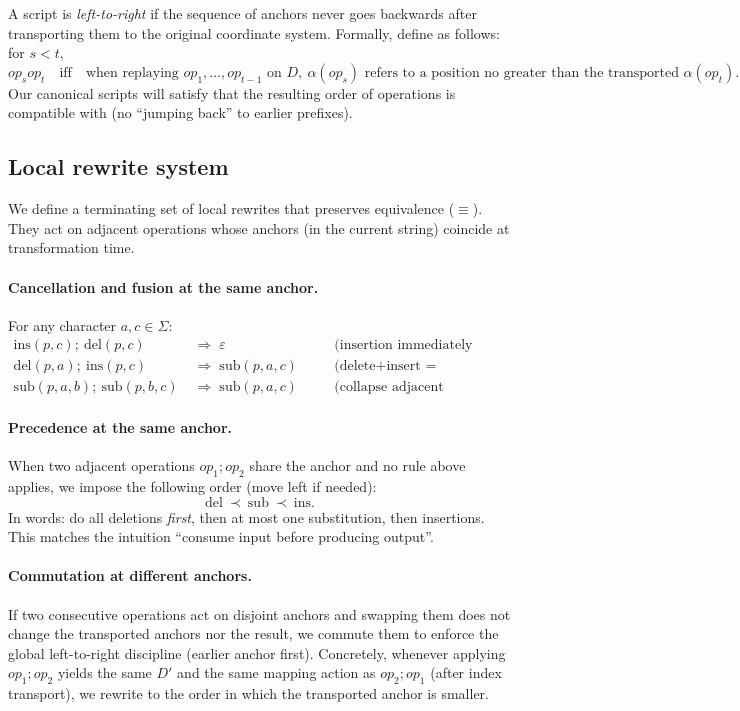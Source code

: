 \documentclass{article}
\begin{document}
A script is \emph{left-to-right} if the sequence of anchors never goes backwards
after transporting them to the original coordinate system. Formally, define as follows: for $s<t$,
\[
op_s op_t \quad\text{iff}\quad
\text{when replaying } op_1,\dots,op_{t-1} \text{ on } D,\ \alpha(op_s)
\text{ refers to a position no greater than the transported } \alpha(op_t).
\]
Our canonical scripts will satisfy that the resulting order of operations is
compatible with (no “jumping back” to earlier prefixes).

\subsection{Local rewrite system}

We define a terminating set of local rewrites that preserves equivalence
($\equiv$). They act on adjacent operations whose anchors (in the current string)
coincide at transformation time.

\paragraph{Cancellation and fusion at the same anchor.}
For any character $a,c\in\Sigma$:
\begin{align*}
	\mathrm{ins}(p,c);\ \mathrm{del}(p,c) &\;\Rightarrow\; \varepsilon \quad &&\text{(insertion immediately deleted)}\\
	\mathrm{del}(p,a);\ \mathrm{ins}(p,c) &\;\Rightarrow\; \mathrm{sub}(p,a,c) \quad &&\text{(delete+insert = substitute)}\\
	\mathrm{sub}(p,a,b);\ \mathrm{sub}(p,b,c) &\;\Rightarrow\; \mathrm{sub}(p,a,c) \quad &&\text{(collapse adjacent substitutions)}
\end{align*}

\paragraph{Precedence at the same anchor.}
When two adjacent operations $op_1;op_2$ share the anchor and no rule above applies,
we impose the following order (move left if needed):
\[
\mathrm{del} \ \prec\ \mathrm{sub} \ \prec\ \mathrm{ins}.
\]
In words: do all deletions \emph{first}, then at most one substitution, then insertions.
This matches the intuition “consume input before producing output”.

\paragraph{Commutation at different anchors.}
If two consecutive operations act on disjoint anchors and swapping them does not
change the transported anchors nor the result, we commute them to enforce the
global left-to-right discipline (earlier anchor first). Concretely, whenever
applying $op_1;op_2$ yields the same $D'$ and the same mapping action as $op_2;op_1$
(after index transport), we rewrite to the order in which the transported anchor is smaller.
\end{document}
